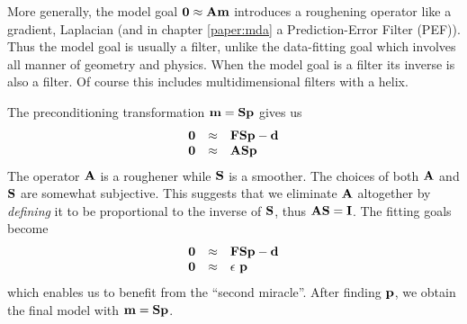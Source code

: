 \par
More generally,
the model goal $\bold 0 \approx \bold A \bold m$
introduces a roughening operator like a gradient,
Laplacian
(and in chapter \ref{paper:mda}
a Prediction-Error Filter (PEF)).
Thus the model goal is usually a filter,
unlike the data-fitting goal
which involves all manner of geometry and physics.
When the model goal is a filter its inverse is also a filter.
Of course this includes multidimensional filters with a helix.


\par
The preconditioning transformation
$\bold m = \bold S \bold p$
gives us
\begin{equation}
        \begin{array}{lll}
        \bold 0 &\approx & \bold F \bold S \bold p - \bold d \\
        \bold 0 &\approx & \bold A \bold S \bold p
        \label{eqn:invintprecond}
        \end{array}
\end{equation}
The operator $\bold A$ is a roughener while $\bold S$ is a smoother.
The choices of both $\bold A$ and $\bold S$ are somewhat subjective.
This suggests that we eliminate $\bold A$ altogether
by {\em  defining} it to be proportional to the inverse of $\bold S$,
thus $\bold A\bold S=\bold I$.
The fitting goals become
\begin{equation}
        \label{eqn:whitevar1}
        \begin{array}{lll}
        \bold 0 &\approx & \bold F  \bold S \bold p - \bold d \\
        \bold 0 &\approx & \epsilon\ \bold p
        \end{array}
\end{equation}
which enables us to benefit from the ``second miracle''.
After finding $\bold p$,
we obtain the final model with $\bold m = \bold S \bold p$.




